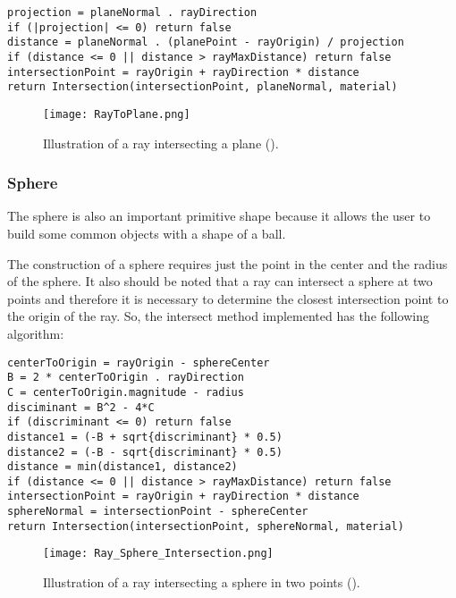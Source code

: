 \begin{lstlisting}
projection = planeNormal . rayDirection
if (|projection| <= 0) return false
distance = planeNormal . (planePoint - rayOrigin) / projection
if (distance <= 0 || distance > rayMaxDistance) return false
intersectionPoint = rayOrigin + rayDirection * distance
return Intersection(intersectionPoint, planeNormal, material)
\end{lstlisting}


\begin{figure}[H]
	\centering
	\caption{Illustration of a ray intersecting a plane (\cite{PlaneRayIntersection}).}
	\label{Plane.}
	\texttt{[image: RayToPlane.png]}
\end{figure}

\subsubsection{Sphere}

\par
The sphere is also an important primitive shape because it allows the user to build some common objects with a shape of a ball.

\par
The construction of a sphere requires just the point in the center and the radius of the sphere.
It also should be noted that a ray can intersect a sphere at two points and therefore it is necessary to determine the closest intersection point to the origin of the ray.
So, the intersect method implemented has the following algorithm:

\begin{lstlisting}
centerToOrigin = rayOrigin - sphereCenter
B = 2 * centerToOrigin . rayDirection
C = centerToOrigin.magnitude - radius
disciminant = B^2 - 4*C
if (discriminant <= 0) return false
distance1 = (-B + sqrt{discriminant} * 0.5)
distance2 = (-B - sqrt{discriminant} * 0.5)
distance = min(distance1, distance2)
if (distance <= 0 || distance > rayMaxDistance) return false
intersectionPoint = rayOrigin + rayDirection * distance
sphereNormal = intersectionPoint - sphereCenter
return Intersection(intersectionPoint, sphereNormal, material)
\end{lstlisting}

\begin{figure}[H]
	\centering
	\caption{Illustration of a ray intersecting a sphere in two points (\cite{SphereRayIntersection}).}
	\label{Sphere.}
	\texttt{[image: Ray\_Sphere\_Intersection.png]}
\end{figure}

